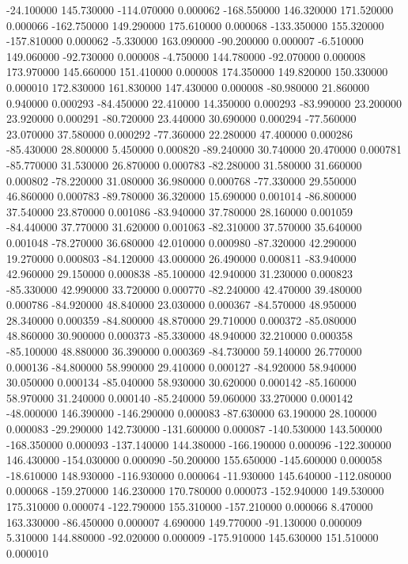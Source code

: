 -24.100000 145.730000 -114.070000 0.000062 
-168.550000 146.320000 171.520000 0.000066 
-162.750000 149.290000 175.610000 0.000068 
-133.350000 155.320000 -157.810000 0.000062 
-5.330000 163.090000 -90.200000 0.000007 
-6.510000 149.060000 -92.730000 0.000008 
-4.750000 144.780000 -92.070000 0.000008 
173.970000 145.660000 151.410000 0.000008 
174.350000 149.820000 150.330000 0.000010 
172.830000 161.830000 147.430000 0.000008 
-80.980000 21.860000 0.940000 0.000293 
-84.450000 22.410000 14.350000 0.000293 
-83.990000 23.200000 23.920000 0.000291 
-80.720000 23.440000 30.690000 0.000294 
-77.560000 23.070000 37.580000 0.000292 
-77.360000 22.280000 47.400000 0.000286 
-85.430000 28.800000 5.450000 0.000820 
-89.240000 30.740000 20.470000 0.000781 
-85.770000 31.530000 26.870000 0.000783 
-82.280000 31.580000 31.660000 0.000802 
-78.220000 31.080000 36.980000 0.000768 
-77.330000 29.550000 46.860000 0.000783 
-89.780000 36.320000 15.690000 0.001014 
-86.800000 37.540000 23.870000 0.001086 
-83.940000 37.780000 28.160000 0.001059 
-84.440000 37.770000 31.620000 0.001063 
-82.310000 37.570000 35.640000 0.001048 
-78.270000 36.680000 42.010000 0.000980 
-87.320000 42.290000 19.270000 0.000803 
-84.120000 43.000000 26.490000 0.000811 
-83.940000 42.960000 29.150000 0.000838 
-85.100000 42.940000 31.230000 0.000823 
-85.330000 42.990000 33.720000 0.000770 
-82.240000 42.470000 39.480000 0.000786 
-84.920000 48.840000 23.030000 0.000367 
-84.570000 48.950000 28.340000 0.000359 
-84.800000 48.870000 29.710000 0.000372 
-85.080000 48.860000 30.900000 0.000373 
-85.330000 48.940000 32.210000 0.000358 
-85.100000 48.880000 36.390000 0.000369 
-84.730000 59.140000 26.770000 0.000136 
-84.800000 58.990000 29.410000 0.000127 
-84.920000 58.940000 30.050000 0.000134 
-85.040000 58.930000 30.620000 0.000142 
-85.160000 58.970000 31.240000 0.000140 
-85.240000 59.060000 33.270000 0.000142 
-48.000000 146.390000 -146.290000 0.000083 
-87.630000 63.190000 28.100000 0.000083 
-29.290000 142.730000 -131.600000 0.000087 
-140.530000 143.500000 -168.350000 0.000093 
-137.140000 144.380000 -166.190000 0.000096 
-122.300000 146.430000 -154.030000 0.000090 
-50.200000 155.650000 -145.600000 0.000058 
-18.610000 148.930000 -116.930000 0.000064 
-11.930000 145.640000 -112.080000 0.000068 
-159.270000 146.230000 170.780000 0.000073 
-152.940000 149.530000 175.310000 0.000074 
-122.790000 155.310000 -157.210000 0.000066 
8.470000 163.330000 -86.450000 0.000007 
4.690000 149.770000 -91.130000 0.000009 
5.310000 144.880000 -92.020000 0.000009 
-175.910000 145.630000 151.510000 0.000010 
